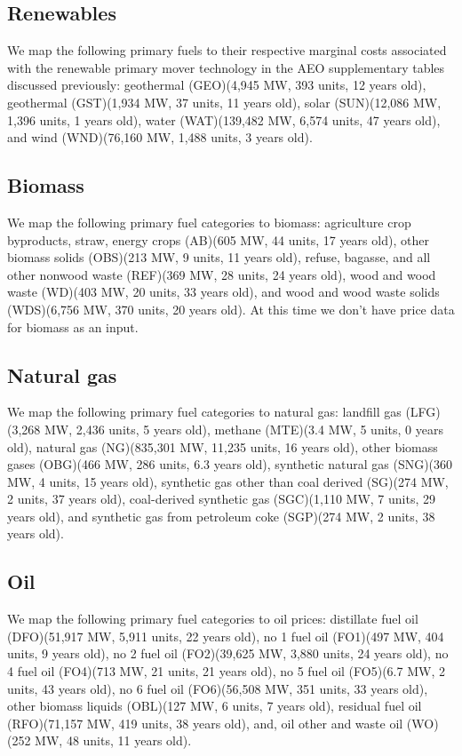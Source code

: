 \documentclass[10pt]{report}
\begin{document}
\subsection{Renewables}
We map the following primary fuels to their respective marginal costs associated with the renewable primary mover technology in the AEO supplementary tables discussed previously: geothermal (GEO)(4,945 MW, 393 units, 12 years old), geothermal (GST)(1,934 MW, 37 units, 11 years old), solar (SUN)(12,086 MW, 1,396 units, 1 years old), water (WAT)(139,482 MW, 6,574 units, 47 years old), and wind (WND)(76,160 MW, 1,488 units, 3 years old). 

\subsection{Biomass}
We map the following primary fuel categories to biomass: agriculture crop byproducts, straw, energy crops (AB)(605 MW, 44 units, 17 years old), other biomass solids (OBS)(213 MW, 9 units, 11 years old), refuse, bagasse, and all other nonwood waste (REF)(369 MW, 28 units, 24 years old), wood and wood waste (WD)(403 MW, 20 units, 33 years old), and wood and wood waste solids (WDS)(6,756 MW, 370 units, 20 years old). 
At this time we don't have price data for biomass as an input. 

\subsection{Natural gas}
We map the following primary fuel categories to natural gas: landfill gas (LFG)(3,268 MW, 2,436 units, 5 years old), methane (MTE)(3.4 MW, 5 units, 0 years old), natural gas (NG)(835,301 MW, 11,235 units, 16 years old), other biomass gases (OBG)(466 MW, 286 units, 6.3 years old), synthetic natural gas (SNG)(360 MW, 4 units, 15 years old), synthetic gas other than coal derived (SG)(274 MW, 2 units, 37 years old), coal-derived synthetic gas (SGC)(1,110 MW, 7 units, 29 years old), and synthetic gas from petroleum coke (SGP)(274 MW, 2 units, 38 years old). 

\subsection{Oil}
We map the following primary fuel categories to oil prices: distillate fuel oil (DFO)(51,917 MW, 5,911 units, 22 years old), no 1 fuel oil (FO1)(497 MW, 404 units, 9 years old), no 2 fuel oil (FO2)(39,625 MW, 3,880 units, 24 years old), no 4 fuel oil (FO4)(713 MW, 21 units, 21 years old), no 5 fuel oil (FO5)(6.7 MW, 2 units, 43 years old), no 6 fuel oil (FO6)(56,508 MW, 351 units, 33 years old), other biomass liquids (OBL)(127 MW, 6 units, 7 years old), residual fuel oil (RFO)(71,157 MW, 419 units, 38 years old), and, oil other and waste oil (WO)(252 MW, 48 units, 11 years old).
\end{document}
